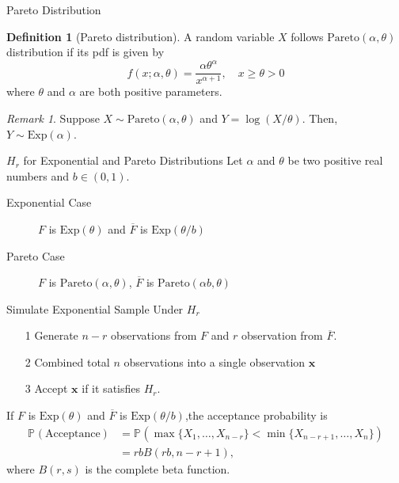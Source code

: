 \documentclass{beamer}
\renewcommand{\P}[2][]{ \mathbb{P}_{#1} \left( #2 \right)}
\theoremstyle{definition}
\newtheorem{defn}{Definition}
\theoremstyle{remark}
\newtheorem*{rem}{Remark}
\begin{document}
        
\begin{frame}{Pareto Distribution}
    \begin{defn}[Pareto distribution]
        A random variable $X$ follows $\mathrm{Pareto}(\alpha,\theta)$ distribution if its pdf is given by
        \[ 
            f(x;\alpha,\theta) = \frac{\alpha \theta^{\alpha}}{x^{\alpha +1}}, \quad x \geqslant \theta >0
            \]
            where $\theta$ and $\alpha$ are both positive parameters.
        \end{defn}

        \begin{rem} \label{lem: log of Pareto is exp}
            Suppose $X \sim \mathrm{Pareto}(\alpha,\theta)$ and $Y = \log(X/\theta)$. Then, $Y \sim \mathrm{Exp}(\alpha)$.
        \end{rem}
    \end{frame}





\begin{frame}{$H_r$ for Exponential and Pareto Distributions }
    Let $\alpha$ and $\theta$ be two positive real numbers and $b \in (0,1)$.
    \begin{description}
        \item[Exponential Case ] $F$ is $\text{Exp}(\theta)$ and $\overline{F}$ is $\text{Exp}(\theta/b)$ \\
        \item[Pareto Case ] $F$ is $\text{Pareto}(\alpha, \theta)$, $\overline{F}$ is $\text{Pareto}(\alpha b, \theta)$
    \end{description}

\end{frame}


\begin{frame}{Simulate Exponential Sample Under $H_r$}
    \begin{enumerate}
        \item[1] Generate $n-r$ observations from $F$ and $r$ observation from $\overline F$.
        \item[2] Combined total $n$ observations into a single observation $\mathbf x$ 
        \item[3] Accept $\mathbf x$ if it satisfies $H_r$.
    \end{enumerate}

    If $F$ is $\text{Exp}(\theta)$ and $\overline{F}$ is $\text{Exp}(\theta/b)$,the acceptance probability is
    \begin{align*}
        \P{\text{Acceptance}} &= \P{\max\{X_{1},\ldots, X_{n-r}\} < \min\{X_{n-r+1},\ldots, X_{n}\}}
        \\
        &= rb B(rb, n-r+1),
    \end{align*}
    where $B(r,s)$ is the complete beta function.
\end{frame}
\end{document}
